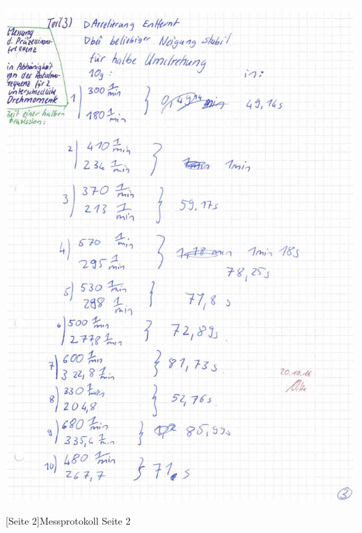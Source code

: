 \documentclass[12pt,a4paper,]{scrreprt}
\begin{document}
        \begin{center}
    		\includegraphics[scale=0.32]{2.jpg}
    	\end{center}
    	[Seite 2]{Messprotokoll Seite 2}
    	\pagebreak
    	
\end{document}
